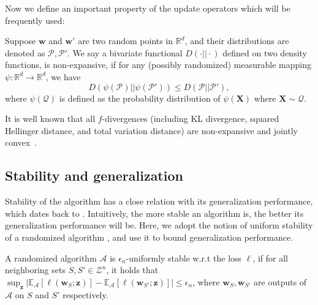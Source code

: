 \documentclass[final,12pt]{colt2018} %
\newcommand{\mc}[1]{\mathcal{#1}}
\newcommand{\mb}[1]{\mathbb{#1}}
\newcommand{\z}{\bm{z}}
\newcommand{\w}{\bm{w}}
\begin{document}

Now we define an important property of the update operators which will be frequently used:
\begin{definition}
 Suppose $\w$ and $\w'$ are two random points in $\mb{R}^d$, and their distributions are denoted as $\mc{P}, \mc{P}'$. We say a bivariate functional $D(\cdot || \cdot)$ defined on two density functions, is non-expansive, if for any (possibly randomized) measurable mapping $\psi: \mb{R}^d \rightarrow \mb{R}^d$, we have
 \begin{equation}
   D(\psi(\mc{P})|| \psi(\mc{P}')) \leqslant D(\mc{P}|| \mc{P}'),
  \end{equation}
  where $\psi(\mathcal{Q})$ is defined as the probability distribution of $\psi(\bm{X})$ where $\bm{X}\sim \mathcal{Q}$.
\end{definition}
It is well known that all $f$-divergences (including KL divergence, squared Hellinger distance, and total variation distance) are non-expansive and jointly convex~\citep{csiszar2004information}.

\subsection{Stability and generalization}
Stability of the algorithm has a close relation with its generalization performance, which dates back to \cite{bousquet2002stability}. Intuitively, the more stable an algorithm is, the better its generalization performance will be. Here, we adopt the notion of uniform stability of a randomized algorithm \citep{elisseeff2005stability,hardt2015train}, and use it to bound generalization performance. 

\begin{definition}
  A randomized algorithm $\mathcal{A}$ is $\epsilon_n$-uniformly stable w.r.t the loss $\ell$, if for all neighboring sets $S, S' \in \mathcal{Z}^n$, it holds that $\sup_{\bm{z}} |\mb{E}_\mathcal{A}[\ell(\bm{w}_S; \z)] - \mb{E}_\mathcal{A}[\ell(\bm{w}_{S'}; \z)]| \leqslant \epsilon_n$, 
  where $\w_S, \w_{S'}$ are outputs of $\mathcal{A}$ on $S$ and $S'$ respectively. 
\end{definition}  
\end{document}
